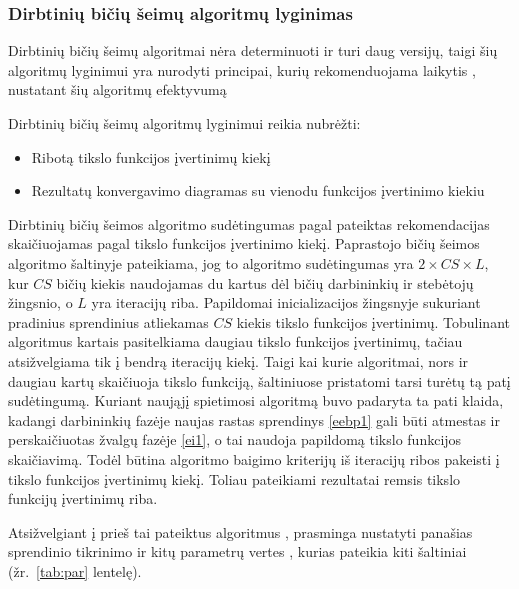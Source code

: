 \documentclass{VUMIFKompMagistrinis}
\begin{document}
\subsubsection{Dirbtinių bičių šeimų algoritmų lyginimas}


Dirbtinių bičių šeimų algoritmai nėra determinuoti ir turi daug versijų, taigi šių algoritmų lyginimui yra nurodyti principai, kurių rekomenduojama laikytis \cite{MLK15}, nustatant šių algoritmų efektyvumą

Dirbtinių bičių šeimų algoritmų lyginimui reikia nubrėžti:
\begin{itemize}
    \item Ribotą tikslo funkcijos įvertinimų kiekį
    \item Rezultatų konvergavimo diagramas su vienodu funkcijos įvertinimo kiekiu
\end{itemize}

Dirbtinių bičių šeimos algoritmo sudėtingumas pagal pateiktas rekomendacijas skaičiuojamas pagal tikslo funkcijos įvertinimo kiekį. Paprastojo bičių šeimos algoritmo šaltinyje pateikiama, jog to algoritmo sudėtingumas yra $2\times CS\times L$, kur $CS$ bičių kiekis naudojamas du kartus dėl bičių darbininkių ir stebėtojų žingsnio, o $L$ yra iteracijų riba. Papildomai inicializacijos žingsnyje sukuriant pradinius sprendinius atliekamas $CS$ kiekis tikslo funkcijos įvertinimų. Tobulinant algoritmus kartais pasitelkiama daugiau tikslo funkcijos įvertinimų, tačiau atsižvelgiama tik į bendrą iteracijų kiekį. Taigi kai kurie algoritmai, nors ir daugiau kartų skaičiuoja tikslo funkciją, šaltiniuose pristatomi tarsi turėtų tą patį sudėtingumą. Kuriant naująjį spietimosi algoritmą buvo padaryta ta pati klaida, kadangi darbininkių fazėje naujas rastas sprendinys \eqref{eebp1} gali būti atmestas ir perskaičiuotas žvalgų fazėje \eqref{ei1}, o tai naudoja papildomą tikslo funkcijos skaičiavimą. Todėl būtina algoritmo baigimo kriterijų iš iteracijų ribos pakeisti į tikslo funkcijos įvertinimų kiekį. Toliau pateikiami rezultatai remsis tikslo funkcijų įvertinimų riba.


Atsižvelgiant į prieš tai pateiktus algoritmus \cite{ABK19, KaG14}, prasminga nustatyti panašias sprendinio tikrinimo ir kitų parametrų vertes , kurias pateikia kiti šaltiniai (žr.~\ref{tab:par} lentelę). 
\end{document}
